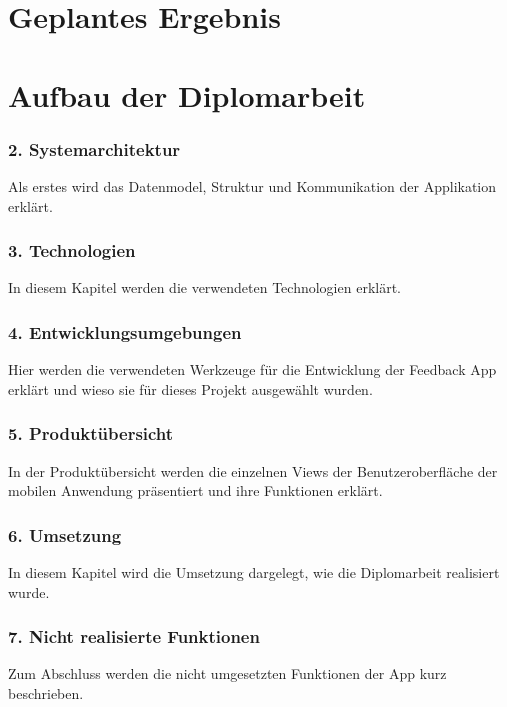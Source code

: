 \section{Geplantes Ergebnis}


\section{Aufbau der Diplomarbeit}

\subsubsection{2. Systemarchitektur}
Als erstes wird das Datenmodel, Struktur und Kommunikation der Applikation erklärt. 

\subsubsection{3. Technologien}
In diesem Kapitel werden die verwendeten Technologien erklärt.

\subsubsection{4. Entwicklungsumgebungen}
Hier werden die verwendeten Werkzeuge für die Entwicklung der Feedback App erklärt und 
wieso sie für dieses Projekt ausgewählt wurden.

\subsubsection{5. Produktübersicht}
In der Produktübersicht werden die einzelnen Views der Benutzeroberfläche der mobilen Anwendung präsentiert 
und ihre Funktionen erklärt.

\subsubsection{6. Umsetzung}
In diesem Kapitel wird die Umsetzung dargelegt, wie die Diplomarbeit realisiert wurde.

\subsubsection{7. Nicht realisierte Funktionen}
Zum Abschluss werden die nicht umgesetzten Funktionen der App kurz beschrieben.